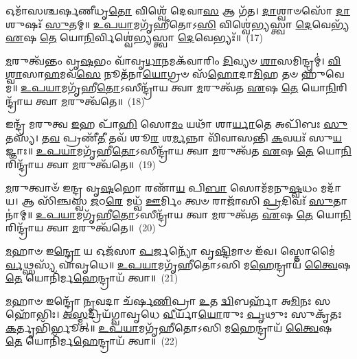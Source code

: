 {\anuvakamend[{𑌇𑌨𑍍𑌦𑍍𑌰𑌾॑𑌗𑍍𑌨𑍀 𑌵𑌿𑍞\-\ul{𑌶}\-𑌤𑌿𑌃}]}%

𑌓𑌮𑌾᳴𑌸𑌶𑍍𑌚𑌰𑍍\mbox{}𑌷𑌣𑍀𑌧𑍃\-\ul{𑌤𑍋} 𑌵𑌿𑌶𑍍𑌵𑍇᳴ 𑌦𑍇𑌵𑌾\-\ul{𑌸} 𑌆 𑌗᳴𑌤। \ul{𑌦𑌾}\-𑌶𑍍𑌵𑌾𑍞𑌸𑍋᳴ \ul{𑌦𑌾}\-𑌶𑍁𑌷𑌃᳴ \ul{𑌸𑍁}\-𑌤𑌮𑍍॥ \ul{𑌉}\-\-\ul{𑌪}\-\-\ul{𑌯𑌾}\-𑌮𑌗𑍃᳴𑌹𑍀𑌤𑍋\-𑌽\-\ul{𑌸𑌿} 𑌵𑌿𑌶𑍍𑌵𑍇॑𑌭𑍍𑌯𑌸𑍍𑌤𑍍𑌵𑌾 \ul{𑌦𑍇}\-𑌵𑍇𑌭𑍍𑌯᳴ \ul{𑌏}\-𑌷 \ul{𑌤𑍇} 𑌯𑍋\-\ul{𑌨𑌿}\-𑌰𑍍𑌵𑌿𑌶𑍍𑌵𑍇॑𑌭𑍍𑌯𑌸𑍍𑌤𑍍𑌵𑌾 \ul{𑌦𑍇}\-𑌵𑍇𑌭𑍍𑌯𑌃᳴॥~(17)

{\anuvakamend[{𑌇𑌨𑍍𑌦𑍍𑌰𑌾॑\-\ul{𑌗𑍍𑌨𑍀} 𑌓𑌮𑌾᳴𑌸𑍋 𑌵𑌿𑍞\-\ul{𑌶}\-𑌤𑌿𑌰𑍍𑌵𑌿𑍞᳴𑌶𑌤𑌿𑌃}]}%

\-\ul{𑌮}\-𑌰𑍁𑌤𑍍𑌵᳴𑌨𑍍𑌤𑌂 𑌵𑍃\-\ul{𑌷}\-𑌭𑌂 𑌵𑌾᳴𑌵𑍃\-\ul{𑌧𑌾}\-𑌨𑌮𑌕᳴𑌵𑌾𑌰𑌿𑌂 \ul{𑌦𑌿}\-𑌵𑍍𑌯𑍞 \ul{𑌶𑌾}\-𑌸𑌮𑌿𑌨𑍍𑌦𑍍𑌰𑌮𑍍॑। \ul{𑌵𑌿}\-\-\ul{𑌶𑍍𑌵𑌾}\-𑌸𑌾\-\ul{𑌹}\-𑌮𑌵᳴\-\ul{𑌸𑍇} 𑌨𑍂𑌤᳴𑌨𑌾\-\ul{𑌯𑍋}\-𑌗𑍍𑌰𑍞 𑌸᳴\-\ul{𑌹𑍋}\-𑌦𑌾\-\ul{𑌮𑌿}\-𑌹 𑌤𑍞 𑌹𑍁᳴𑌵𑍇𑌮॥ \ul{𑌉}\-\-\ul{𑌪}\-\-\ul{𑌯𑌾}\-𑌮𑌗𑍃᳴𑌹𑍀\-\ul{𑌤𑍋}\-\-𑌽𑌸𑍀𑌨𑍍𑌦𑍍𑌰𑌾᳴𑌯 𑌤𑍍𑌵𑌾 \ul{𑌮}\-𑌰𑍁𑌤𑍍𑌵᳴𑌤 \ul{𑌏}\-𑌷 \ul{𑌤𑍇} 𑌯𑍋\-\ul{𑌨𑌿}\-𑌰𑌿𑌨𑍍𑌦𑍍𑌰𑌾᳴𑌯 𑌤𑍍𑌵𑌾 \ul{𑌮}\-𑌰𑍁𑌤𑍍𑌵᳴𑌤𑍇॥~(18)

{\anuvakamend[{\-\ul{𑌮}\-𑌰𑍁𑌤𑍍𑌵᳴\-\ul{𑌨𑍍𑌤}\-\-\ul{𑍞} 𑌷𑌡𑍍𑌵𑌿𑍞᳴𑌶𑌤𑌿𑌃}]}%

𑌇𑌨𑍍𑌦𑍍𑌰᳴ 𑌮𑌰𑍁𑌤𑍍𑌵 \ul{𑌇}\-𑌹 𑌪𑌾᳴\-\ul{𑌹𑌿} 𑌸𑍋\-\ul{𑌮𑌂} 𑌯𑌥𑌾᳴ 𑌶𑌾\-\ul{𑌰𑍍𑌯𑌾}\-𑌤𑍇 𑌅𑌪𑌿᳴𑌬𑌃 \ul{𑌸𑍁}\-𑌤𑌸𑍍𑌯᳴। 𑌤\-\ul{𑌵} 𑌪𑍍𑌰𑌣𑍀᳴\-\ul{𑌤𑍀} 𑌤𑌵᳴ 𑌶𑍂\-\ul{𑌰} 𑌶\-\ul{𑌰𑍍𑌮}\-𑌨𑍍𑌨𑌾 𑌵𑌿᳴𑌵𑌾𑌸𑌨𑍍𑌤𑌿 \ul{𑌕}\-𑌵𑌯𑌃᳴ 𑌸𑍁\-\ul{𑌯}\-𑌜𑍍𑌞𑌾𑌃॥ \ul{𑌉}\-\-\ul{𑌪}\-\-\ul{𑌯𑌾}\-𑌮𑌗𑍃᳴𑌹𑍀\-\ul{𑌤𑍋}\-\-𑌽𑌸𑍀𑌨𑍍𑌦𑍍𑌰𑌾᳴𑌯 𑌤𑍍𑌵𑌾 \ul{𑌮}\-𑌰𑍁𑌤𑍍𑌵᳴𑌤 \ul{𑌏}\-𑌷 \ul{𑌤𑍇} 𑌯𑍋\-\ul{𑌨𑌿}\-𑌰𑌿𑌨𑍍𑌦𑍍𑌰𑌾᳴𑌯 𑌤𑍍𑌵𑌾 \ul{𑌮}\-𑌰𑍁𑌤𑍍𑌵᳴𑌤𑍇॥~(19)

{\anuvakamend[{𑌇𑌨𑍍𑌦𑍍𑌰𑍈\-\ul{𑌕𑌾}\-𑌨𑍍𑌨\-\ul{𑌤𑍍𑌰𑌿}\-\-\ul{𑍞}\-𑌶𑌤𑍍}]}%

\-\ul{𑌮}\-𑌰𑍁𑌤𑍍𑌵𑌾𑍞᳴ 𑌇𑌨𑍍𑌦𑍍𑌰 𑌵𑍃\-\ul{𑌷}\-𑌭𑍋 𑌰𑌣𑌾᳴\-\ul{𑌯} 𑌪𑌿\-\ul{𑌬𑌾} 𑌸𑍋𑌮᳴𑌮𑌨𑍁\-\ul{𑌷𑍍𑌵}\-𑌧𑌂 𑌮𑌦𑌾᳴𑌯। 𑌆 𑌸𑌿᳴𑌞𑍍𑌚𑌸𑍍𑌵 \ul{𑌜}\-𑌠\-\ul{𑌰𑍇} 𑌮𑌧𑍍𑌵᳴ \ul{𑌊}\-𑌰𑍍𑌮𑌿𑌂 𑌤𑍍𑌵𑍞 𑌰𑌾𑌜𑌾᳴𑌸𑌿 \ul{𑌪𑍍𑌰}\-𑌦𑌿𑌵𑌃᳴ \ul{𑌸𑍁}\-𑌤𑌾𑌨𑌾॑𑌮𑍍॥ \ul{𑌉}\-\-\ul{𑌪}\-\-\ul{𑌯𑌾}\-𑌮𑌗𑍃᳴𑌹𑍀\-\ul{𑌤𑍋}\-\-𑌽𑌸𑍀𑌨𑍍𑌦𑍍𑌰𑌾᳴𑌯 𑌤𑍍𑌵𑌾 \ul{𑌮}\-𑌰𑍁𑌤𑍍𑌵᳴𑌤 \ul{𑌏}\-𑌷 \ul{𑌤𑍇} 𑌯𑍋\-\ul{𑌨𑌿}\-𑌰𑌿𑌨𑍍𑌦𑍍𑌰𑌾᳴𑌯 𑌤𑍍𑌵𑌾 \ul{𑌮}\-𑌰𑍁𑌤𑍍𑌵᳴𑌤𑍇॥~(20)

{\anuvakamend[{𑌇𑌨𑍍𑌦𑍍𑌰᳴ 𑌮𑌰𑍁𑌤𑍍𑌵𑍋 \ul{𑌮}\-𑌰𑍁\-\ul{𑌤𑍍𑌵𑌾}\-𑌨𑍇\-\ul{𑌕𑌾}\-𑌨𑍍𑌨 \ul{𑌤𑍍𑌰𑌿}\-\-\ul{𑍞}\-𑌶𑌦𑍇\-\ul{𑌕𑌾}\-𑌨𑍍𑌨 \ul{𑌤𑍍𑌰𑌿}\-\-\ul{𑍞}\-𑌶𑌤𑍍}]}%

\-\ul{𑌮}\-𑌹𑌾𑍞 𑌇\-\ul{𑌨𑍍𑌦𑍍𑌰𑍋} 𑌯 𑌓𑌜᳴𑌸𑌾 \ul{𑌪}\-𑌰𑍍𑌜𑌨𑍍𑌯𑍋᳴ 𑌵𑍃\-\ul{𑌷𑍍𑌟𑌿}\-𑌮𑌾𑍞 𑌇᳴𑌵। 𑌸𑍍𑌤𑍋𑌮𑍈॑\-\ul{𑌰𑍍𑌵}\-𑌥𑍍𑌸𑌸𑍍𑌯᳴ 𑌵𑌾𑌵𑍃𑌧𑍇॥ \ul{𑌉}\-\-\ul{𑌪}\-\-\ul{𑌯𑌾}\-𑌮𑌗𑍃᳴𑌹𑍀𑌤𑍋\-𑌽𑌸𑌿 𑌮\-\ul{𑌹𑍇}\-𑌨𑍍𑌦𑍍𑌰𑌾𑌯᳴ \ul{𑌤𑍍𑌵𑍈}\-𑌷 \ul{𑌤𑍇} 𑌯𑍋𑌨𑌿᳴𑌰𑍍𑌮\-\ul{𑌹𑍇}\-𑌨𑍍𑌦𑍍𑌰𑌾𑌯᳴ 𑌤𑍍𑌵𑌾॥~(21)

{\anuvakamend[{\-\ul{𑌮}\-𑌹𑌾𑌨𑍇\-\ul{𑌕𑌾}\-𑌨𑍍𑌨𑌵𑌿𑍞᳴𑌶𑌤𑌿𑌃}]}%

\-\ul{𑌮}\-𑌹𑌾𑍞 𑌇𑌨𑍍𑌦𑍍𑌰𑍋᳴ \ul{𑌨𑍃}\-𑌵𑌦𑌾 𑌚᳴𑌰𑍍\mbox{}𑌷\-\ul{𑌣𑌿}\-𑌪𑍍𑌰𑌾 \ul{𑌉}\-𑌤 \ul{𑌦𑍍𑌵𑌿}\-𑌬𑌰𑍍\mbox{}𑌹𑌾᳴ 𑌅\-\ul{𑌮𑌿}\-𑌨𑌃 𑌸𑌹𑍋᳴𑌭𑌿𑌃। \ul{𑌅}\-\-\ul{𑌸𑍍𑌮}\-𑌦𑍍𑌰𑌿𑌯᳴𑌗𑍍𑌵𑌾𑌵𑍃𑌧𑍇 \ul{𑌵𑍀}\-𑌰𑍍𑌯𑌾᳴\-\ul{𑌯𑍋}\-𑌰𑍁𑌃 \ul{𑌪𑍃}\-𑌥𑍁𑌃 𑌸𑍁𑌕𑍃᳴𑌤𑌃 \ul{𑌕}\-𑌰𑍍𑌤𑍃𑌭𑌿᳴𑌰𑍍𑌭𑍂𑌤𑍍॥ \ul{𑌉}\-\-\ul{𑌪}\-\-\ul{𑌯𑌾}\-𑌮𑌗𑍃᳴𑌹𑍀𑌤𑍋\-𑌽𑌸𑌿 𑌮\-\ul{𑌹𑍇}\-𑌨𑍍𑌦𑍍𑌰𑌾𑌯᳴ \ul{𑌤𑍍𑌵𑍈}\-𑌷 \ul{𑌤𑍇} 𑌯𑍋𑌨𑌿᳴𑌰𑍍𑌮\-\ul{𑌹𑍇}\-𑌨𑍍𑌦𑍍𑌰𑌾𑌯᳴ 𑌤𑍍𑌵𑌾॥~(22)

